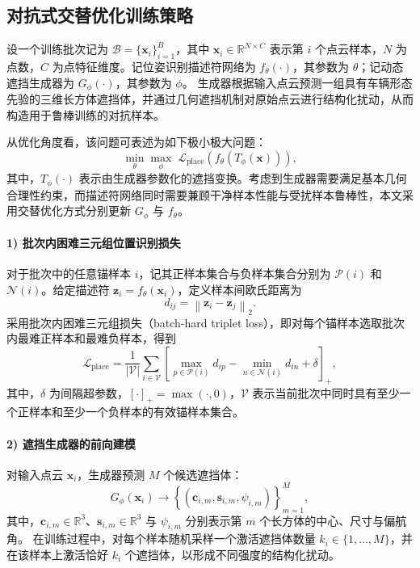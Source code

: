 \subsection{对抗式交替优化训练策略}
\label{sec:adv_alternating_training_cn}

设一个训练批次记为 $\mathcal{B}=\{\mathbf{x}_i\}_{i=1}^{B}$，其中
$\mathbf{x}_i \in \mathbb{R}^{N \times C}$ 表示第 $i$ 个点云样本，$N$ 为点数，$C$ 为点特征维度。记位姿识别描述符网络为
$f_{\theta}(\cdot)$，其参数为 $\theta$；记动态遮挡生成器为 $G_{\phi}(\cdot)$，其参数为 $\phi$。
生成器根据输入点云预测一组具有车辆形态先验的三维长方体遮挡体，并通过几何遮挡机制对原始点云进行结构化扰动，从而构造用于鲁棒训练的对抗样本。

从优化角度看，该问题可表述为如下极小极大问题：
\begin{equation}
\min_{\theta}\max_{\phi}\;
\mathcal{L}_{\mathrm{place}}\!\left(f_{\theta}\!\left(T_{\phi}(\mathbf{x})\right)\right),
\label{eq:cn_minmax_objective}
\end{equation}
其中，$T_{\phi}(\cdot)$ 表示由生成器参数化的遮挡变换。考虑到生成器需要满足基本几何合理性约束，而描述符网络同时需要兼顾干净样本性能与受扰样本鲁棒性，本文采用交替优化方式分别更新 $G_{\phi}$ 与 $f_{\theta}$。

\paragraph{1) 批次内困难三元组位置识别损失}
对于批次中的任意锚样本 $i$，记其正样本集合与负样本集合分别为 $\mathcal{P}(i)$ 和 $\mathcal{N}(i)$。给定描述符
$\mathbf{z}_i=f_{\theta}(\mathbf{x}_i)$，定义样本间欧氏距离为
\begin{equation}
d_{ij}=\left\lVert \mathbf{z}_i-\mathbf{z}_j \right\rVert_2.
\label{eq:cn_pair_distance}
\end{equation}
采用批次内困难三元组损失（batch-hard triplet loss），即对每个锚样本选取批次内最难正样本和最难负样本，得到
\begin{equation}
\mathcal{L}_{\mathrm{place}}
=
\frac{1}{|\mathcal{V}|}
\sum_{i \in \mathcal{V}}
\left[
\max_{p \in \mathcal{P}(i)} d_{ip}
-
\min_{n \in \mathcal{N}(i)} d_{in}
+
\delta
\right]_+,
\label{eq:cn_batch_hard_triplet}
\end{equation}
其中，$\delta$ 为间隔超参数，$[\cdot]_+=\max(\cdot,0)$，$\mathcal{V}$ 表示当前批次中同时具有至少一个正样本和至少一个负样本的有效锚样本集合。

\paragraph{2) 遮挡生成器的前向建模}
对输入点云 $\mathbf{x}_i$，生成器预测 $M$ 个候选遮挡体：
\begin{equation}
G_{\phi}(\mathbf{x}_i)
\rightarrow
\left\{
\left(\mathbf{c}_{i,m}, \mathbf{s}_{i,m}, \psi_{i,m}\right)
\right\}_{m=1}^{M},
\label{eq:cn_generator_box_param}
\end{equation}
其中，$\mathbf{c}_{i,m}\in\mathbb{R}^{3}$、$\mathbf{s}_{i,m}\in\mathbb{R}^{3}$ 与 $\psi_{i,m}$ 分别表示第 $m$ 个长方体的中心、尺寸与偏航角。
在训练过程中，对每个样本随机采样一个激活遮挡体数量 $k_i \in \{1,\dots,M\}$，并在该样本上激活恰好 $k_i$ 个遮挡体，以形成不同强度的结构化扰动。


